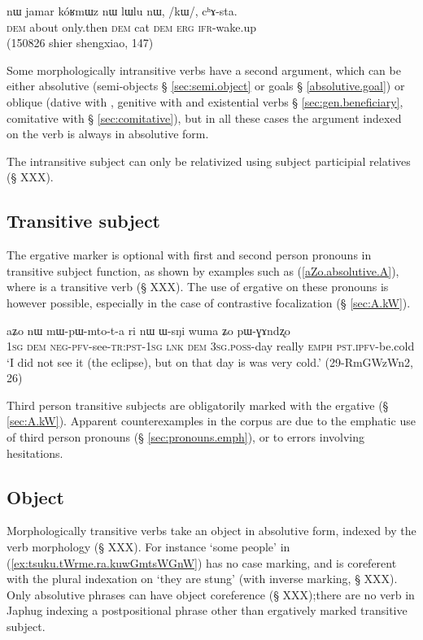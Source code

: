 \begin{exe}
\ex \label{ex:kW.chAsta}
 \gll nɯ jamar kóʁmɯz nɯ lɯlu nɯ, /kɯ/, cʰɤ-sta. \\
 \textsc{dem} about only.then \textsc{dem} cat \textsc{dem} \textsc{erg} \textsc{ifr}-wake.up \\
 \glt (150826 shier shengxiao, 147)
\end{exe}

Some morphologically intransitive verbs have a second argument, which can be either absolutive (semi-objects § \ref{sec:semi.object} or goals § \ref{absolutive.goal}) or oblique (dative with , genitive with  and existential verbs § \ref{sec:gen.beneficiary},  comitative with  § \ref{sec:comitative}), but in all these cases the argument indexed on the verb is always in absolutive form. 

The intransitive subject can only be relativized using subject participial relatives (§ XXX).

\subsection{Transitive subject} \label{sec:absolutive.A}
The ergative marker is optional with first and second person pronouns in transitive subject function, as shown by examples such as (\ref{aZo.absolutive.A}), where  is a transitive verb (§ XXX). The use of ergative on these pronouns is however possible, especially in the case of contrastive focalization (§ \ref{sec:A.kW}).

\begin{exe}
\ex \label{aZo.absolutive.A}
 \gll aʑo nɯ mɯ-pɯ-mto-t-a ri nɯ ɯ-sŋi wuma ʑo pɯ-ɣɤndʐo \\
\textsc{1sg} \textsc{dem} \textsc{neg}-\textsc{pfv}-see-\textsc{tr}:\textsc{pst}-\textsc{1sg} \textsc{lnk} \textsc{dem} \textsc{3sg}.\textsc{poss}-day really \textsc{emph} \textsc{pst}.\textsc{ipfv}-be.cold  \\
 \glt `I did not see it (the eclipse), but on that day is was very cold.' (29-RmGWzWn2, 26)
\end{exe}

Third person transitive subjects are obligatorily marked with the ergative (§ \ref{sec:A.kW}). Apparent counterexamples in the corpus are due to the emphatic use of third person pronouns (§ \ref{sec:pronouns.emph}), or to errors involving hesitations.

\subsection{Object} \label{sec:absolutive.P}
Morphologically transitive verbs take an object in absolutive form, indexed by the verb morphology (§ XXX). For instance  `some people' in (\ref{ex:tsuku.tWrme.ra.kuwGmtsWGnW}) has no case marking, and is coreferent with the plural indexation on  `they are stung' (with inverse marking, § XXX). Only absolutive phrases can have object coreference (§ XXX);there are no verb in Japhug indexing a postpositional phrase other than ergatively marked transitive subject.

